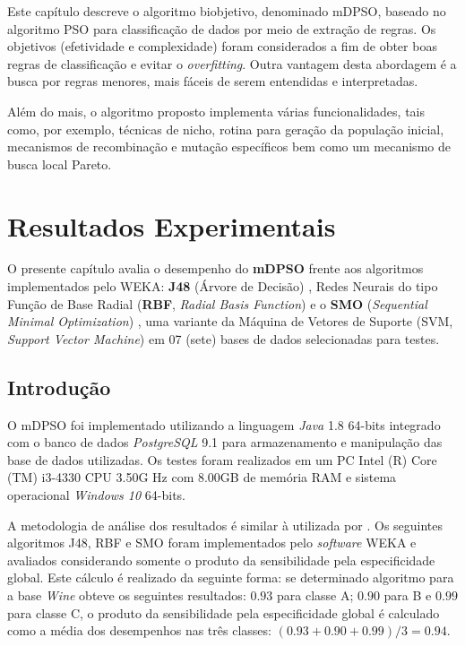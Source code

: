 \documentclass[
	12pt,				%
	openany,			%
	oneside,	
	a4paper,			%
	brazil,				%
	]{unimontes-ppgmsc-abntex2}
\begin{document}
Este capítulo descreve o algoritmo biobjetivo, denominado mDPSO, baseado no algoritmo PSO para classificação de dados por meio de extração de regras. Os objetivos (efetividade e complexidade) foram considerados a fim de obter boas regras de classificação e evitar o {\em overfitting}. Outra vantagem desta abordagem é a busca por regras menores, mais fáceis de serem entendidas e interpretadas.  

Além do mais, o algoritmo proposto implementa várias funcionalidades, tais como, por exemplo, técnicas de nicho, rotina para geração da população inicial, mecanismos de recombinação e mutação específicos bem como um mecanismo de busca local Pareto. 




\chapter{Resultados Experimentais}
\label{ch:resultados}

O presente capítulo avalia o desempenho do \textbf{mDPSO} frente aos algoritmos implementados pelo WEKA: \textbf{J48} (Árvore de Decisão) \cite{Quinlan_1986},  Redes Neurais do tipo Função de Base Radial (\textbf{RBF}, {\em Radial Basis Function}) \cite{Broomhead_1988} e o \textbf{SMO} ({\em Sequential Minimal Optimization}) \cite{Keerthi_2001}, uma variante da Máquina de Vetores de Suporte (SVM, {\em Support Vector Machine}) em 07 (sete) bases de dados selecionadas para testes.

\section{Introdução}

O mDPSO foi implementado utilizando a linguagem {\em Java} 1.8 64-bits integrado com o banco de dados {\em PostgreSQL} 9.1 para armazenamento e manipulação das base de dados utilizadas. Os testes foram realizados em um PC Intel (R) Core (TM) i3-4330 CPU 3.50G Hz com 8.00GB de memória RAM e sistema operacional {\em Windows 10} 64-bits.

A metodologia de análise dos resultados é similar à utilizada por . Os seguintes algoritmos J48, RBF e SMO foram implementados pelo {\em software} WEKA e avaliados considerando somente o produto da sensibilidade pela especificidade global. Este cálculo é realizado da seguinte forma: se determinado algoritmo para a base {\em Wine} obteve os seguintes resultados: $0.93$ para classe A; $0.90$ para B e $0.99$ para classe C, o produto da sensibilidade pela especificidade global é calculado como a média dos desempenhos nas três classes: $(0.93+0.90+0.99)/3 = 0.94$. 
\end{document}
